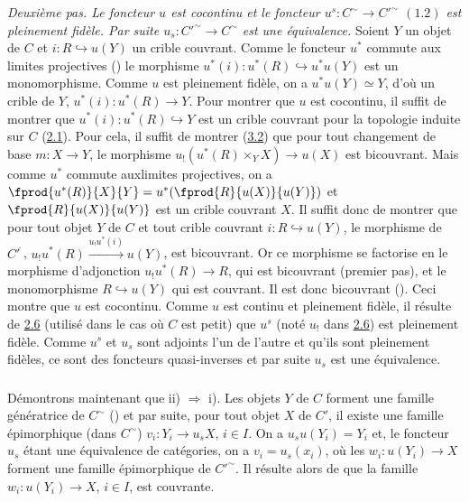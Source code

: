 \documentclass[10pt]{../fichiers-configuration-latex/smfart}
\begin{document}
\noindent \emph{Deuxième pas. Le foncteur $u$ est cocontinu et le
foncteur $u^s:C^{\sim}\rightarrow {C'}^{\sim}$ $(\hyperref[III.prop1.2]{1.2})$
est pleinement fidèle. Par suite $u_s:{C'}^{\sim}\rightarrow
C^{\sim}$ est une équivalence.} Soient $Y$ un objet de $C$ et
$i:R\hookrightarrow u(Y)$ un crible couvrant. Comme le foncteur
$u^{\ast}$ commute aux limites projectives () le
morphisme $u^{\ast}(i):u^{\ast}(R)\hookrightarrow u^{\ast}u(Y)$ est
un monomorphisme. Comme $u$ est pleinement fidèle, on a
$u^{\ast}u(Y)\simeq Y$, d'où un crible de $Y$,
$u^{\ast}(i):u^{\ast}(R)\rightarrow Y$. Pour montrer que $u$ est
cocontinu, il suffit de montrer que
$u^{\ast}(i):u^{\ast}(R)\hookrightarrow Y$ est un crible couvrant
pour la topologie induite sur $C$ (\hyperref[III.def2.1]{2.1}). Pour cela, il
suffit de montrer (\hyperref[III.prop3.2]{3.2}) que pour tout changement de
base $m:X\rightarrow Y$, le morphisme $u_{!}(u^{\ast}(R)\times_Y
X)\rightarrow u(X)$ est bicouvrant. Mais comme $u^{\ast}$ commute
aux\pageoriginale limites projectives, on a
$\fprod{u^{\ast}(R)}{X}{Y}=u^{\ast}(\fprod{R}{u(X)}{u(Y)})$ et
$\fprod{R}{u(X)}{u(Y)}$ est un crible couvrant $X$. Il suffit donc
de montrer que pour tout objet $Y$ de $C$ et tout crible couvrant
$i:R\hookrightarrow u(Y)$, le morphisme de
${C'}^{\widehat{\phantom{,}}}$,
$u_{!}u^{\ast}(R)\xrightarrow{u_{!}u^{\ast}(i)} u(Y)$, est
bicouvrant. Or ce morphisme se factorise en le morphisme
d'adjonction $u_{!}u^{\ast}(R)\rightarrow R$, qui est bicouvrant
(premier pas), et le monomorphisme $R\hookrightarrow u(Y)$ qui est
couvrant. Il est donc bicouvrant (). Ceci montre que
$u$ est cocontinu. Comme $u$ est continu et pleinement fidèle, il
résulte de \hyperref[III.prop2.6]{2.6} (utilisé dans le cas où $C$ est
petit) que $u^s$ (noté $u_{!}$ dans \hyperref[III.prop2.6]{2.6}) est
pleinement fidèle. Comme $u^s$ et $u_s$ sont adjoints l'un de
l'autre et qu'ils sont pleinement fidèles, ce sont des foncteurs
quasi-inverses et par suite $u_s$ est une équivalence.

\setcounter{subsection}{1}
\subsubsection{}
Démontrons maintenant que ii) $\Rightarrow$ i). Les objets $Y$
de $C$ forment une famille génératrice de $C^{\sim}$
() et par suite, pour tout objet $X$ de $C'$, il
existe une famille épimorphique (dans $C^{\sim}$)
$v_i:Y_i\rightarrow u_s X$, $i\in I$. On a $u_su(Y_i)=Y_i$ et, le
foncteur $u_s$ étant une équivalence de catégories, on a
$v_i=u_s(x_i)$, où les $w_i:u(Y_i)\rightarrow X$ forment une
famille épimorphique de ${C'}^{\sim}$. Il résulte alors de
 que la famille $w_i:u(Y_i)\rightarrow X$, $i\in I$,
est couvrante.
\end{document}
